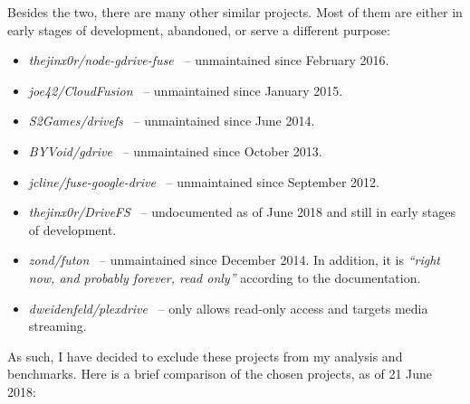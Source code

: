 Besides the two, there are many other similar projects. Most of them are either in early stages of development, abandoned, or serve a different purpose:

\begin{itemize}
  \itemsep0em
  \item \emph{thejinx0r/node-gdrive-fuse}~\cite{thejinx0r/node-gdrive-fuse} -- unmaintained since February 2016.
  \item \emph{joe42/CloudFusion}~\cite{joe42/CloudFusion} -- unmaintained since January 2015.
  \item \emph{S2Games/drivefs}~\cite{S2Games/drivefs} -- unmaintained since June 2014.
  \item \emph{BYVoid/gdrive}~\cite{BYVoid/gdrive} -- unmaintained since October 2013.
  \item \emph{jcline/fuse-google-drive}~\cite{jcline/fuse-google-drive} -- unmaintained since September 2012.
  \item \emph{thejinx0r/DriveFS}~\cite{thejinx0r/DriveFS} -- undocumented as of June 2018 and still in early stages of development.
  \item \emph{zond/futon}~\cite{zond/futon} -- unmaintained since December 2014. In addition, it is \emph{``right now, and probably forever, read only''} according to the documentation.
  \item \emph{dweidenfeld/plexdrive}~\cite{dweidenfeld/plexdrive} -- only allows read-only access and targets media streaming.
\end{itemize}

As such, I have decided to exclude these projects from my analysis and benchmarks. Here is a brief comparison of the chosen projects, as of 21 June 2018:

\vspace{1em}

